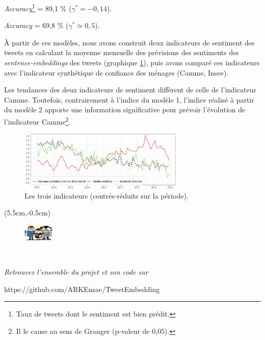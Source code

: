 \documentclass[10pt,french,french]{article}
\let\rmarkdownfootnote\footnote%
\def\footnote{\protect\rmarkdownfootnote}
\begin{document}
\begin{multicols}{2}
\faArrowCircleRight{} \emph{Accuracy}\footnote{Taux de tweets dont le sentiment est bien prédit.} =  89,1 \% ($\gamma^* = -0,14$).

\faArrowCircleRight{} \emph{Accuracy} =  69,8 \% ($\gamma^* \simeq 0,5$).

 \end{multicols}

À partir de ces modèles, nous avons construit deux indicateurs de
sentiment des tweets en calculant la moyenne mensuelle des prévisions
des sentiments des \emph{sentence-embeddings} des tweets (graphique
\ref{fig:bslogcam}), puis avons comparé ces indicateurs avec
l'indicateur synthétique de confiance des ménages (Camme, Insee).

Les tendances des deux indicateurs de sentiment diffèrent de celle de
l'indicateur Camme. Toutefois, contrairement à l'indice du modèle 1,
l'indice réalisé à partir du modèle 2 apporte une information
significative pour prévoir l'évolution de l'indicateur Camme\footnote{Il
  le cause au sens de Granger (p-valeur de 0,05).}.

\begin{figure}[htp]
\begin{center}
\includegraphics[width =0.7\textwidth]{img/rmd-graphSentiments-1}
\captionsetup{margin=0cm,format=hang,justification=justified}
\caption{Les trois indicateurs (centrés-réduits sur la période).}\label{fig:bslogcam}
\end{center}
\end{figure}

\begin{textblock*}{\textwidth}(5.5cm,-0.5cm)
\begin{center}
\begin{minipage}{0.7\textwidth}

\begin{figure}
\includegraphics[height=0.8cm]{img/avatars.png}
\end{figure}

$\phantom{saut}$

\emph{Retrouvez l'ensemble du projet et son code sur}

https://github.com/ARKEnsae/TweetEmbedding

\end{minipage}
\end{center}

\end{textblock*}
\end{document}
